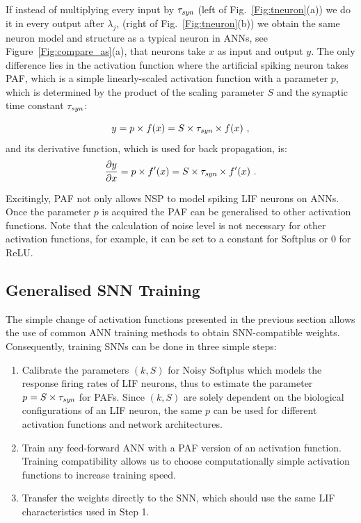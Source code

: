 	
	If instead of multiplying every input by $\tau_{\textit{\textrm{syn}}}$ (left of Fig.~\ref{Fig:tneuron}(a)) we do it in every output after $\lambda_j$, (right of Fig.~\ref{Fig:tneuron}(b)) we obtain the same neuron model and structure as a typical neuron in ANNs, see Figure~\ref{Fig:compare_as}(a), that neurons take $x$ as input and output $y$.
	The only difference lies in the activation function where the artificial spiking neuron takes PAF, which is a simple linearly-scaled activation function with a parameter $p$, which is determined by the product of the scaling parameter $S$ and the synaptic time constant $\tau_{\textit{\textrm{syn}}}$:
	
	\begin{equation}
	y = p \times f(x) = S \times \tau_{\textit{\textrm{syn}}} \times f(x)~,
	\label{equ:PAF}
	\end{equation}
	and its derivative function, which is used for back propagation, is:
	\begin{equation}
	\frac{\partial y}{\partial x} = p \times f'(x) = S \times \tau_{\textit{\textrm{syn}}} \times f'(x)~.
	\end{equation}
	
	Excitingly, PAF not only allows NSP to model spiking LIF neurons on ANNs.
	Once the parameter $p$ is acquired the PAF can be generalised to other activation functions.
	Note that the calculation of noise level is not necessary for other activation functions, for example, it can be set to a constant for Softplus or 0 for ReLU.
	\subsection{Generalised SNN Training}
	\label{subsec:ns_train}
	
	The simple change of activation functions presented in the previous section allows the use of common ANN training methods to obtain SNN-compatible weights.
	Consequently, training SNNs can be done in three simple steps: 
	\begin{enumerate}
		\item Calibrate the parameters $(k, S)$ for Noisy Softplus which models the response firing rates of LIF neurons, thus to estimate the parameter $p=S \times \tau_{\textit{\textrm{syn}}}$ for PAFs. Since $(k, S)$ are solely dependent on the biological configurations of an LIF neuron, the same $p$ can be used for different activation functions and network architectures.
		\item Train any feed-forward ANN with a PAF version of an activation function.
		Training compatibility allows us to choose computationally simple activation functions to increase training speed.
		\item Transfer the weights directly to the SNN, which should use the same LIF characteristics used in Step 1.
	\end{enumerate}
	
